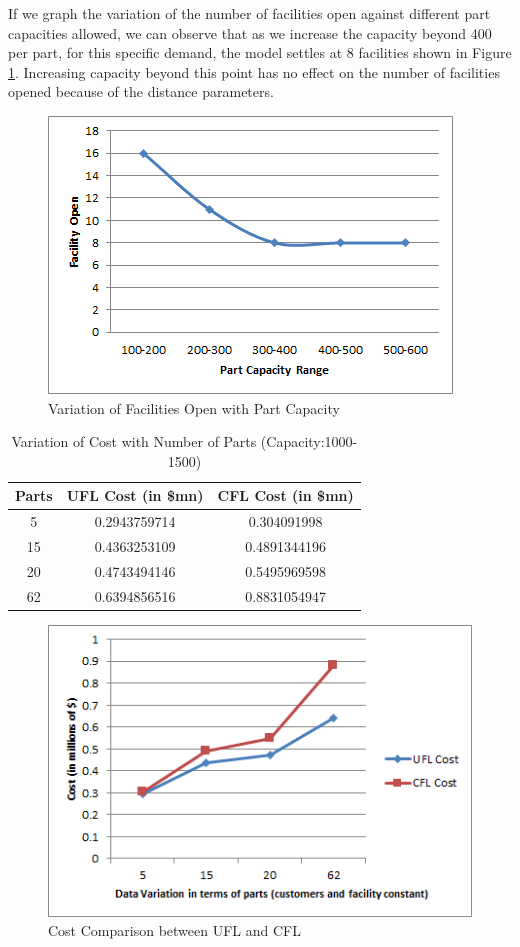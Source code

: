 \documentclass[12pt]{article}
\numberwithin{equation}{section}
\begin{document}
If we graph the variation of the number of facilities open against different part capacities allowed, we can observe that as we increase the capacity beyond 400 per part, for this specific demand, the model settles at 8 facilities shown in Figure \ref{fig:facparts}. Increasing capacity beyond this point has no effect on the number of facilities opened because of the distance parameters.\\
\begin{figure}[H]
\centering
  \includegraphics[scale=0.9]{Facilities.png}
  \caption{Variation of Facilities Open with Part Capacity}
  \label{fig:facparts}
\end{figure}
\begin{table}[H]
\centering
\caption{Variation of Cost with Number of Parts (Capacity:1000-1500)}
\begin{tabular}{|c|c|c|}
\hline
\textbf{Parts} & \textbf{UFL Cost (in \$mn)} & \textbf{CFL Cost (in \$mn)} \\ \hline
5 & 0.2943759714 & 0.304091998 \\ \hline
15 & 0.4363253109 & 0.4891344196 \\ \hline
20 & 0.4743494146 & 0.5495969598 \\ \hline
62 & 0.6394856516 & 0.8831054947 \\ \hline
\end{tabular}
\end{table}
\begin{figure}[H]
\centering
  \includegraphics[scale=0.9]{Cost.png}
  \caption{Cost Comparison between UFL and CFL}
  \label{fig:Cost}
\end{figure}
\end{document}
